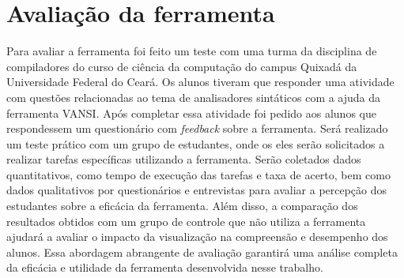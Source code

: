 


\section{Avaliação da ferramenta}
Para avaliar a ferramenta foi feito um teste com uma turma da disciplina de compiladores do curso de ciência da computação do campus Quixadá da Universidade Federal do Ceará. Os alunos tiveram que responder uma atividade com questões relacionadas ao tema de analisadores sintáticos com a ajuda da ferramenta VANSI. Após completar essa atividade foi pedido aos alunos que respondessem um questionário com \textit{feedback} sobre a ferramenta.
Será realizado um teste prático com um grupo de estudantes, onde os eles serão solicitados a realizar tarefas específicas utilizando a ferramenta. Serão coletados dados quantitativos, como tempo de execução das tarefas e taxa de acerto, bem como dados qualitativos por questionários e entrevistas para avaliar a percepção dos estudantes sobre a eficácia da ferramenta. Além disso, a comparação dos resultados obtidos com um grupo de controle que não utiliza a ferramenta ajudará a avaliar o impacto da visualização na compreensão e desempenho dos alunos. Essa abordagem abrangente de avaliação garantirá uma análise completa da eficácia e utilidade da ferramenta desenvolvida nesse trabalho.

